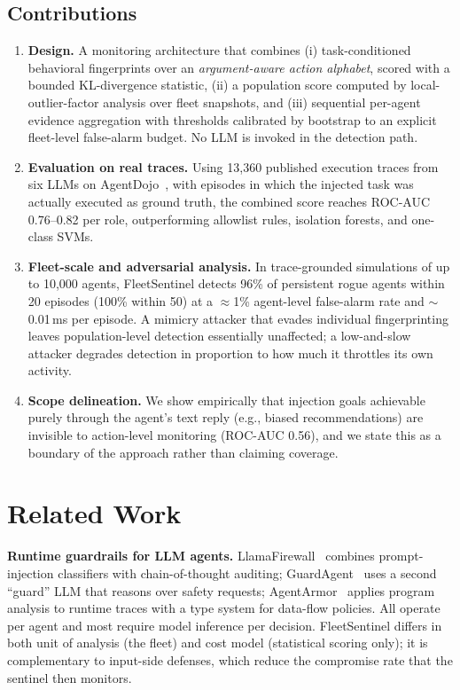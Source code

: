 \documentclass[conference]{IEEEtran}
\newcommand{\sys}{FleetSentinel}
\begin{document}
\subsection*{Contributions}
\begin{enumerate}
    \item \textbf{Design.} A monitoring architecture that combines (i) task-conditioned behavioral fingerprints over an \emph{argument-aware action alphabet}, scored with a bounded KL-divergence statistic, (ii) a population score computed by local-outlier-factor analysis over fleet snapshots, and (iii) sequential per-agent evidence aggregation with thresholds calibrated by bootstrap to an explicit fleet-level false-alarm budget. No LLM is invoked in the detection path.
    \item \textbf{Evaluation on real traces.} Using 13{,}360 published execution traces from six LLMs on AgentDojo~\cite{debenedetti2024agentdojo}, with episodes in which the injected task was actually executed as ground truth, the combined score reaches ROC-AUC 0.76--0.82 per role, outperforming allowlist rules, isolation forests, and one-class SVMs.
    \item \textbf{Fleet-scale and adversarial analysis.} In trace-grounded simulations of up to 10{,}000 agents, \sys{} detects 96\% of persistent rogue agents within 20 episodes (100\% within 50) at a $\approx$1\% agent-level false-alarm rate and $\sim$0.01\,ms per episode. A mimicry attacker that evades individual fingerprinting leaves population-level detection essentially unaffected; a low-and-slow attacker degrades detection in proportion to how much it throttles its own activity.
    \item \textbf{Scope delineation.} We show empirically that injection goals achievable purely through the agent's text reply (e.g., biased recommendations) are invisible to action-level monitoring (ROC-AUC 0.56), and we state this as a boundary of the approach rather than claiming coverage.
\end{enumerate}

\section{Related Work}
\textbf{Runtime guardrails for LLM agents.} LlamaFirewall~\cite{chennabasappa2025llamafirewall} combines prompt-injection classifiers with chain-of-thought auditing; GuardAgent~\cite{xiang2024guardagent} uses a second ``guard'' LLM that reasons over safety requests; AgentArmor~\cite{agentarmor2025} applies program analysis to runtime traces with a type system for data-flow policies. All operate per agent and most require model inference per decision. \sys{} differs in both unit of analysis (the fleet) and cost model (statistical scoring only); it is complementary to input-side defenses, which reduce the compromise rate that the sentinel then monitors.
\end{document}
